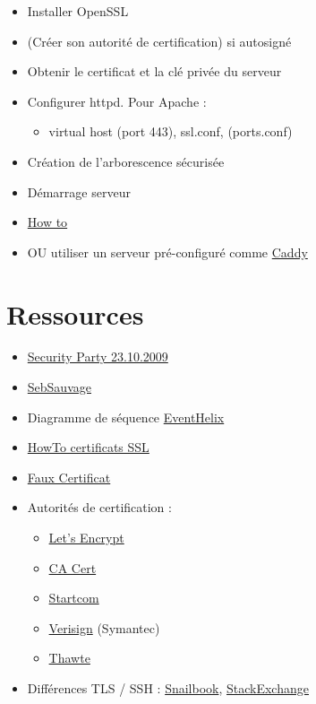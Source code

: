 \begin{itemize}
\tightlist
\item
  Installer OpenSSL
\item
  (Créer son autorité de certification) si autosigné
\item
  Obtenir le certificat et la clé privée du serveur
\item
  Configurer httpd. Pour Apache :

  \begin{itemize}
  \tightlist
  \item
    virtual host (port 443), ssl.conf, (ports.conf)
  \end{itemize}
\item
  Création de l'arborescence sécurisée
\item
  Démarrage serveur
\item
  \href{http://www.vanemery.com/Linux/Apache/apache-SSL.html}{How to}
\item
  OU utiliser un serveur pré-configuré comme
  \href{https://caddyserver.com/}{Caddy}
\end{itemize}

\hypertarget{ressources}{%
\section{Ressources}\label{ressources}}

\begin{itemize}
\tightlist
\item
  \href{https://wiki.alphanet.ch/Ateliers/PresentationSecurityParty}{Security
  Party 23.10.2009}
\item
  \href{http://www.sebsauvage.net/comprendre/ssl/}{SebSauvage}
\item
  Diagramme de séquence
  \href{http://www.eventhelix.com/realtimemantra/networking/SSL.pdf}{EventHelix}
\item
  \href{http://www.win.tue.nl/hashclash/rogue-ca/}{HowTo certificats
  SSL}
\item
  \href{http://www.win.tue.nl/hashclash/rogue-ca/}{Faux Certificat}
\item
  Autorités de certification :

  \begin{itemize}
  \tightlist
  \item
    \href{https://letsencrypt.org/}{Let's Encrypt}
  \item
    \href{http://www.cacert.org/}{CA Cert}
  \item
    \href{http://www.startcom.org/}{Startcom}
  \item
    \href{https://www.verisign.com/?dmn=www.verisign.ch}{Verisign}
    (Symantec)
  \item
    \href{https://www.thawte.com/}{Thawte}
  \end{itemize}
\item
  Différences TLS / SSH :
  \href{http://www.snailbook.com/faq/ssl.auto.html}{Snailbook},
  \href{http://security.stackexchange.com/questions/1599/what-is-the-difference-between-ssl-vs-ssh-which-is-more-secure}{StackExchange}
\end{itemize}


